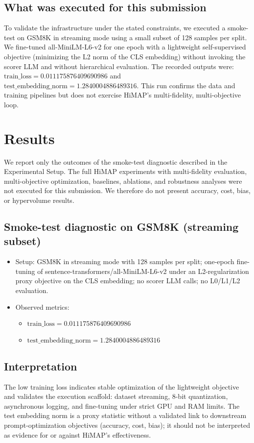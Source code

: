 \documentclass{article}
\begin{document}
\subsection{What was executed for this submission}
To validate the infrastructure under the stated constraints, we executed a smoke-test on GSM8K in streaming mode using a small subset of 128 samples per split. We fine-tuned all-MiniLM-L6-v2 for one epoch with a lightweight self-supervised objective (minimizing the L2 norm of the CLS embedding) without invoking the scorer LLM and without hierarchical evaluation. The recorded outputs were: \(\text{train\_loss} = 0.011175876409690986\) and \(\text{test\_embedding\_norm} = 1.2840004886489316\). This run confirms the data and training pipelines but does not exercise HiMAP's multi-fidelity, multi-objective loop.

\section{Results}
We report only the outcomes of the smoke-test diagnostic described in the Experimental Setup. The full HiMAP experiments with multi-fidelity evaluation, multi-objective optimization, baselines, ablations, and robustness analyses were not executed for this submission. We therefore do not present accuracy, cost, bias, or hypervolume results.

\subsection{Smoke-test diagnostic on GSM8K (streaming subset)}
\begin{itemize}
  \item Setup: GSM8K in streaming mode with 128 samples per split; one-epoch fine-tuning of sentence-transformers/all-MiniLM-L6-v2 under an L2-regularization proxy objective on the CLS embedding; no scorer LLM calls; no L0/L1/L2 evaluation.
  \item Observed metrics:
  \begin{itemize}
    \item \(\text{train\_loss} = 0.011175876409690986\)
    \item \(\text{test\_embedding\_norm} = 1.2840004886489316\)
  \end{itemize}
\end{itemize}

\subsection{Interpretation}
The low training loss indicates stable optimization of the lightweight objective and validates the execution scaffold: dataset streaming, 8-bit quantization, asynchronous logging, and fine-tuning under strict GPU and RAM limits. The test embedding norm is a proxy statistic without a validated link to downstream prompt-optimization objectives (accuracy, cost, bias); it should not be interpreted as evidence for or against HiMAP's effectiveness.
\end{document}

